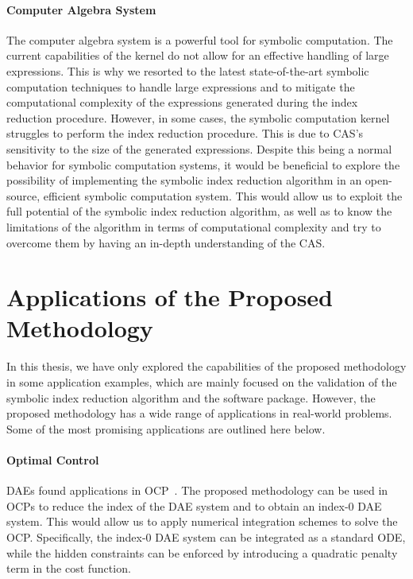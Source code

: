 \paragraph{Computer Algebra System}

The \Maple{} computer algebra system is a powerful tool for symbolic computation. The current capabilities of the \Maple{} kernel do not allow for an effective handling of large expressions. This is why we resorted to the latest state-of-the-art symbolic computation techniques to handle large expressions and to mitigate the computational complexity of the expressions generated during the index reduction procedure. However, in some cases, the \Maple{} symbolic computation kernel struggles to perform the index reduction procedure. This is due to \ac{CAS}'s sensitivity to the size of the generated expressions. Despite this being a normal behavior for symbolic computation systems, it would be beneficial to explore the possibility of implementing the symbolic index reduction algorithm in an open-source, efficient symbolic computation system. This would allow us to exploit the full potential of the symbolic index reduction algorithm, as well as to know the limitations of the algorithm in terms of computational complexity and try to overcome them by having an in-depth understanding of the \ac{CAS}.

\section{Applications of the Proposed Methodology}

In this thesis, we have only explored the capabilities of the proposed methodology in some application examples, which are mainly focused on the validation of the symbolic index reduction algorithm and the \Indigo{} software package. However, the proposed methodology has a wide range of applications in real-world problems. Some of the most promising applications are outlined here below.

\paragraph{Optimal Control}

\acp{DAE} found applications in \ac{OCP}~\cite{gerdts2012optimal, gerdts2003optimal, gerdts2005gradient}. The proposed methodology can be used in \acp{OCP} to reduce the index of the \ac{DAE} system and to obtain an index-0 \ac{DAE} system. This would allow us to apply numerical integration schemes to solve the \ac{OCP}. Specifically, the index-0 \ac{DAE} system can be integrated as a standard \ac{ODE}, while the hidden constraints can be enforced by introducing a quadratic penalty term in the cost function.

